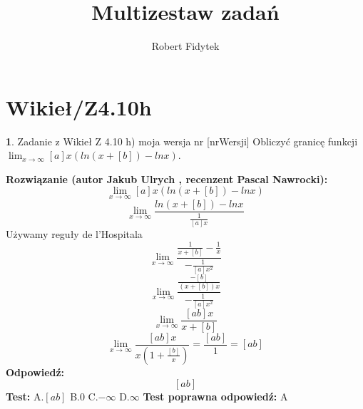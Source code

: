 \documentclass[12pt, a4paper]{article}
\title{Multizestaw zadań}
\author{Robert Fidytek}
\date{}
\theoremstyle{definition} %
\newtheorem{zad}{}
\newcommand{\kategoria}[1]{\section{#1}} %
\newcommand{\zadStart}[1]{\begin{zad}#1\newline} %
\newcommand{\zadStop}{\end{zad}}   %
\newcommand{\rozwStart}[2]{\noindent \textbf{Rozwiązanie (autor #1 , recenzent #2): }\newline} %
\newcommand{\rozwStop}{\newline}                                            %
\newcommand{\odpStart}{\noindent \textbf{Odpowiedź:}\newline}    %
\newcommand{\odpStop}{\newline}                                             %
\newcommand{\testStart}{\noindent \textbf{Test:}\newline} %
\newcommand{\testStop}{\newline} %
\newcommand{\kluczStart}{\noindent \textbf{Test poprawna odpowiedź:}\newline} %
\newcommand{\kluczStop}{\newline} %
\begin{document}
\maketitle


\kategoria{Wikieł/Z4.10h}
\zadStart{Zadanie z Wikieł Z 4.10 h) moja wersja nr [nrWersji]}
Obliczyć granicę funkcji $\lim_{x \to \infty}[a]x(ln(x+[b])-lnx)$.
\zadStop
\rozwStart{Jakub Ulrych}{Pascal Nawrocki}
$$\lim_{x \to \infty}[a]x(ln(x+[b])-lnx)$$
$$\lim_{x \to \infty}\frac{ln(x+[b])-lnx}{\frac{1}{[a]x}}$$
Używamy reguły de l'Hospitala
$$\lim_{x \to \infty}\frac{\frac{1}{x+[b]}-\frac{1}{x}}{-\frac{1}{[a]x^{2}}}$$
$$\lim_{x \to \infty}\frac{\frac{-[b]}{(x+[b])x}}{-\frac{1}{[a]x^{2}}}$$
$$\lim_{x \to \infty}\frac{[ab]x}{x+[b]}$$
$$\lim_{x \to \infty}\frac{[ab]x}{x(1+\frac{[b]}{x})}=\frac{[ab]}{1}=[ab]$$
\rozwStop
\odpStart
$$[ab]$$
\odpStop
\testStart
A.$[ab]$
B.$0$
C.$-\infty$
D.$\infty$
\testStop
\kluczStart
A
\kluczStop
\end{document}
